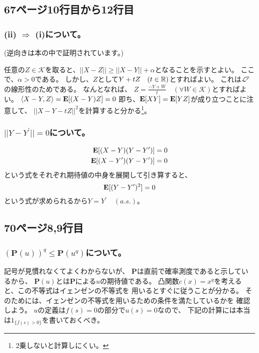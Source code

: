     \subsection{67ページ10行目から12行目}
      \subsubsection{(ii) $\Rightarrow$ (i)について。}
        (逆向きは本の中で証明されています。)

        任意の$Z \in \mathcal{K}$を取ると、$||X - Z|| \ge ||X - Y|| + \alpha$となることを示すとよい。
        ここで、$\alpha > 0$である。
        しかし、$Z$として$Y + tZ \quad (t \in {\mathbb{R}})$とすればよい。
        これは$\mathcal{L}^p$の線形性のためである。
        なんとなれば、
        $Z = \frac{-Y+ W}{t} \quad (\forall W \in \mathcal{K})$とすればよい。
        $\langle X - Y, Z \rangle = {\mathbf{E}}[(X - Y)Z] = 0$
        即ち、${\mathbf{E}}[XY] = {\mathbf{E}}[YZ]$が成り立つことに注意して、
        $||X - Y - tZ||^2$を計算すると分かる\footnote{2乗しないと計算しにくい。}。

      \subsubsection{$||Y - Y^{\prime}|| = 0$について。}
        \begin{align*}
          {\mathbf{E}}[(X - Y)(Y - Y^{\prime})] = 0\\
          {\mathbf{E}}[(X - Y^{\prime})(Y - Y^{\prime})] = 0
        \end{align*}
        という式をそれぞれ期待値の中身を展開して引き算すると、
        \[
          {\mathbf{E}}[(Y - Y^{\prime})^2] = 0
        \]
        という式が求められるから$Y = Y^{\prime}\quad (a.s.)$。

    \subsection{70ページ8,9行目}
      \subsubsection{$(\mathbf{P}(u))^q \leq \mathbf{P}(u^q)$について。}
        記号が見慣れなくてよくわからないが、
        $\mathbf{P}$は直前で確率測度であると示しているから、
        $\mathbf{P}(u)$とは$\mathbf{P}$による$u$の期待値である。
        凸関数$c(x) = x ^q$を考えると、この不等式はイェンゼンの不等式を
        用いるとすぐに従うことが分かる。
        そのためには、イェンゼンの不等式を用いるための条件を満たしているかを
        確認しよう。
        $u$の定義は$f(s) = 0$の部分で$u(s) = 0$なので、
        下記の計算には本当は$1_{\{f(s) > 0\}}$を書いておくべき。

